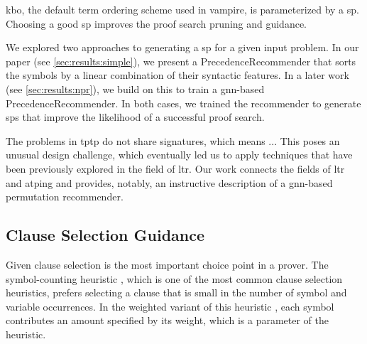 \Gls{kbo}, the default term ordering scheme used in \gls{vampire}, is parameterized by a \gls{sp}.
Choosing a good \gls{sp} improves the proof search pruning and guidance.

We explored two approaches to generating a \gls{sp} for a given input problem.
In our paper \cite{} (see \cref{sec:results:simple}), we present a \gls{PrecedenceRecommender} that sorts the symbols by a linear combination of their syntactic features.
In a later work (see \cref{sec:results:npr}), we build on this to train a \acrshort{gnn}-based \gls{PrecedenceRecommender}.
In both cases, we trained the recommender to generate \glspl{sp} that improve the likelihood of a successful proof search.


The problems in \gls{tptp} do not share signatures,
which means ...\todo{}
This poses an unusual design challenge,
which eventually led us to apply techniques that have been previously explored in the field of \gls{ltr}.
Our work connects the fields of \gls{ltr} and \gls{atping} and provides, notably, an instructive description of a \acrshort{gnn}-based permutation recommender.

\subsection{Clause Selection Guidance}
\label{sec:contrib:ClauseSelection}


Given clause selection is the most important choice point in a prover.
The symbol-counting heuristic \cite{DBLP:conf/cade/SchulzM16}, which is one of the most common clause selection heuristics,
prefers selecting a clause that is small in the number of symbol and variable occurrences.
In the weighted variant of this heuristic \cite{E-manual},
each symbol contributes an amount specified by its weight,
which is a parameter of the heuristic.

